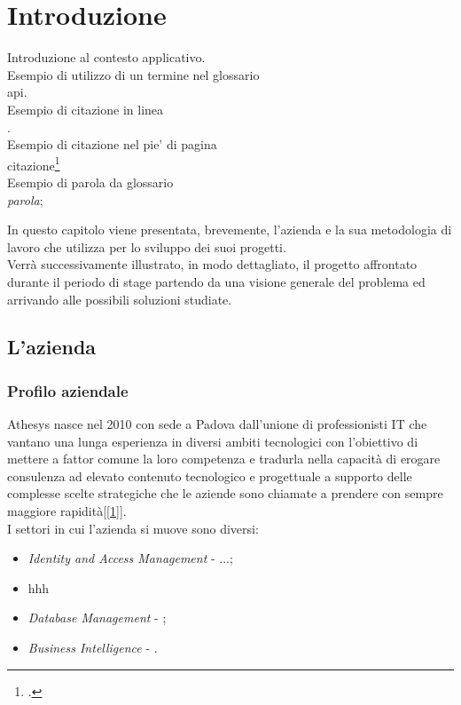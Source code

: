
\chapter{Introduzione}
\label{cap:introduzione}

Introduzione al contesto applicativo.\\

\noindent Esempio di utilizzo di un termine nel glossario \\
\gls{api}. \\

\noindent Esempio di citazione in linea \\
\cite{site:agile-manifesto}. \\

\noindent Esempio di citazione nel pie' di pagina \\
citazione\footcite{womak:lean-thinking} \\

\noindent Esempio di parola da glossario\\
\emph{parola}\glsfirstoccur;

In questo capitolo viene presentata, brevemente, l'azienda e la sua metodologia di lavoro che utilizza per lo sviluppo dei suoi progetti.\\
Verrà successivamente illustrato, in modo dettagliato, il progetto affrontato durante il periodo di stage partendo da una visione generale del problema ed arrivando alle possibili soluzioni studiate.

\section{L'azienda}
\subsection{Profilo aziendale}
Athesys nasce nel 2010 con sede a Padova dall’unione di professionisti IT che vantano una lunga esperienza in diversi ambiti tecnologici con l’obiettivo di mettere a fattor comune la loro competenza e tradurla nella capacità di erogare consulenza ad elevato contenuto tecnologico e progettuale a supporto delle complesse scelte strategiche che le aziende sono chiamate a prendere con sempre maggiore rapidità[\ref{1}].\\
I settori in cui l'azienda si muove sono diversi:
\begin{itemize}
	\item \textit{Identity and Access Management} - ...;
	\item hhh
	\item \textit{Database Management} - ;
	\item \textit{Business Intelligence} - .
\end{itemize}

